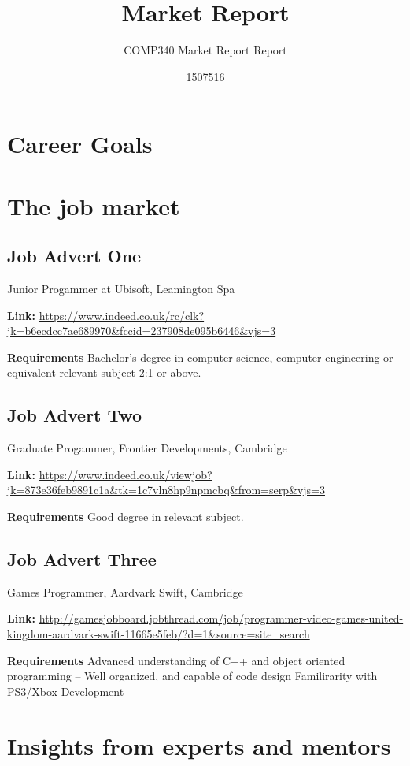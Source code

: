 \documentclass{scrartcl}
\title{Market Report}
\subtitle{COMP340 Market Report Report}
\author{1507516}
\begin{document}
\maketitle


\section{Career Goals}

\section{The job market}


\subsection{Job Advert One}
Junior Progammer at Ubisoft, Leamington Spa

\textbf{Link: }
\url{https://www.indeed.co.uk/rc/clk?jk=b6ecdcc7ae689970&fccid=237908de095b6446&vjs=3}

\textbf{Requirements}
Bachelor's degree in computer science, computer engineering or equivalent relevant subject 2:1 or above.

\subsection{Job Advert Two}
Graduate Progammer, Frontier Developments, Cambridge

\textbf{Link: }
\url{https://www.indeed.co.uk/viewjob?jk=873e36feb9891c1a&tk=1c7vln8hp9npmcbq&from=serp&vjs=3}

\textbf{Requirements}
Good degree in relevant subject.

\subsection{Job Advert Three}
Games Programmer, Aardvark Swift, Cambridge

\textbf{Link:}
\url{http://gamesjobboard.jobthread.com/job/programmer-video-games-united-kingdom-aardvark-swift-11665e5feb/?d=1&source=site_search}


\textbf{Requirements}
Advanced understanding of C++ and object oriented programming
– Well organized, and capable of code design
Familirarity with PS3/Xbox Development


\section{Insights from experts and mentors}
\end{document}
